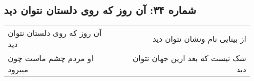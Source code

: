 \begin{center}
\section*{شماره ۳۴: آن روز که روی دلستان نتوان دید}
\label{sec:034}
\begin{longtable}{l p{0.5cm} r}
آن روز که روی دلستان نتوان دید
&&
از بینایی نام ونشان نتوان دید
\\
او مردم چشم ماست چون میبرود
&&
شک نیست که بعد ازین جهان نتوان دید
\\
\end{longtable}
\end{center}
